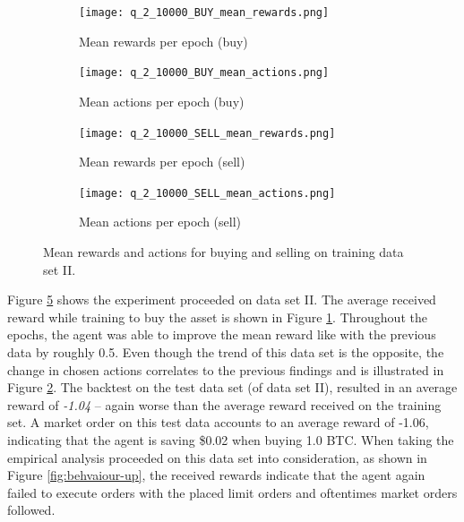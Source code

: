 \begin{figure}[H]
    \centering
    \begin{subfigure}[b]{0.45\textwidth}
        \texttt{[image: q\_2\_10000\_BUY\_mean\_rewards.png]}
        \caption{Mean rewards per epoch (buy)}
        \label{fig:analysis-q-learn-2-reward-buy}
    \end{subfigure}
    \begin{subfigure}[b]{0.45\textwidth}
        \texttt{[image: q\_2\_10000\_BUY\_mean\_actions.png]}
        \caption{Mean actions per epoch (buy)}
        \label{fig:analysis-q-learn-2-action-buy}
    \end{subfigure}
    \begin{subfigure}[b]{0.45\textwidth}
        \texttt{[image: q\_2\_10000\_SELL\_mean\_rewards.png]}
        \caption{Mean rewards per epoch (sell)}
        \label{fig:analysis-q-learn-2-reward-sell}
    \end{subfigure}
    \begin{subfigure}[b]{0.45\textwidth}
        \texttt{[image: q\_2\_10000\_SELL\_mean\_actions.png]}
        \caption{Mean actions per epoch (sell)}
        \label{fig:analysis-q-learn-2-action-sell}
    \end{subfigure}
    \caption{Mean rewards and actions for buying and selling on training data set II.}
    \label{fig:analysis-q-learn-2}
\end{figure}

Figure \ref{fig:analysis-q-learn-2} shows the experiment proceeded on data set II.
The average received reward while training to buy the asset is shown in Figure \ref{fig:analysis-q-learn-2-reward-buy}.
Throughout the epochs, the agent was able to improve the mean reward like with the previous data by roughly 0.5.
Even though the trend of this data set is the opposite, the change in chosen actions correlates to the previous findings and is illustrated in Figure \ref{fig:analysis-q-learn-2-action-buy}.
The backtest on the test data set (of data set II), resulted in an average reward of \textit{-1.04} -- again worse than the average reward received on the training set.
A market order on this test data accounts to an average reward of -1.06, indicating that the agent is saving \$0.02 when buying 1.0 BTC.
When taking the empirical analysis proceeded on this data set into consideration, as shown in Figure \ref{fig:behvaiour-up}, the received rewards indicate that the agent again failed to execute orders with the placed limit orders and oftentimes market orders followed.

